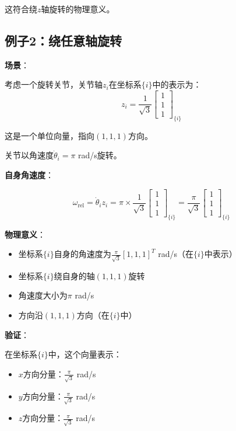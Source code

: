 \documentclass[12pt,a4paper]{article}
\begin{document}
这符合绕$z$轴旋转的物理意义。

\subsection{例子2：绕任意轴旋转}

\textbf{场景}：

考虑一个旋转关节，关节轴$z_i$在坐标系$\{i\}$中的表示为：
\begin{equation}
z_i = \frac{1}{\sqrt{3}} \begin{bmatrix} 1 \\ 1 \\ 1 \end{bmatrix}_{\{i\}}
\end{equation}

这是一个单位向量，指向$(1,1,1)$方向。

关节以角速度$\dot{\theta}_i = \pi$ rad/s旋转。

\textbf{自身角速度}：

\begin{equation}
\omega_{\text{rel}} = \dot{\theta}_i z_i = \pi \times \frac{1}{\sqrt{3}} \begin{bmatrix} 1 \\ 1 \\ 1 \end{bmatrix}_{\{i\}} = \frac{\pi}{\sqrt{3}} \begin{bmatrix} 1 \\ 1 \\ 1 \end{bmatrix}_{\{i\}}
\end{equation}

\textbf{物理意义}：
\begin{itemize}
\item 坐标系$\{i\}$自身的角速度为$\frac{\pi}{\sqrt{3}}[1, 1, 1]^T$ rad/s（在$\{i\}$中表示）
\item 坐标系$\{i\}$绕自身的轴$(1,1,1)$旋转
\item 角速度大小为$\pi$ rad/s
\item 方向沿$(1,1,1)$方向（在$\{i\}$中）
\end{itemize}

\textbf{验证}：

在坐标系$\{i\}$中，这个向量表示：
\begin{itemize}
\item $x$方向分量：$\frac{\pi}{\sqrt{3}}$ rad/s
\item $y$方向分量：$\frac{\pi}{\sqrt{3}}$ rad/s
\item $z$方向分量：$\frac{\pi}{\sqrt{3}}$ rad/s
\end{itemize}
\end{document}
